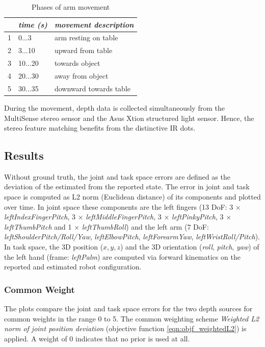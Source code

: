 \begin{table}[h]
\centering
\begin{tabular}{|c|l|l|}
\hline
 & \emph{time (s)} & \emph{movement description} \\
\hline
1 & 0$\dots$3 & arm resting on table \\
\hline
2 & 3$\dots$10 & upward from table \\
\hline
3 & 10$\dots$20 & towards object \\
\hline
4 & 20$\dots$30 & away from object \\
\hline
5 & 30$\dots$35 & downward towards table \\
\hline
\end{tabular}
\caption{Phases of arm movement}
\label{tab:prior_movement_phases}
\end{table}

During the movement, depth data is collected simultaneously from the MultiSense stereo sensor and the Asus Xtion structured light sensor. Hence, the stereo feature matching benefits from the distinctive IR dots.

\subsection{Results}
\label{sec:prior_results}

Without ground truth, the joint and task space errors are defined as the deviation of the estimated from the reported state.
The error in joint and task space is computed as L2 norm (Euclidean distance) of its components and plotted over time. In joint space these components are the left fingers (13 DoF: 3 $\times$ \emph{leftIndexFingerPitch}, 3 $\times$ \emph{leftMiddleFingerPitch}, 3 $\times$ \emph{leftPinkyPitch}, 3 $\times$ \emph{leftThumbPitch} and 1 $\times$ \emph{leftThumbRoll}) and the left arm (7 DoF: \emph{leftShoulderPitch/Roll/Yaw}, \emph{leftElbowPitch}, \emph{leftForearmYaw}, \emph{leftWristRoll/Pitch}). In task space, the 3D position ($x,y,z$) and the 3D orientation (\textit{roll}, \textit{pitch}, \textit{yaw}) of the left hand (frame: \emph{leftPalm}) are computed via forward kinematics on the reported and estimated robot configuration.

\subsubsection{Common Weight}

The plots compare the joint and task space errors for the two depth sources for common weights in the range 0 to 5. The common weighting scheme \emph{Weighted L2 norm of joint position deviation} (objective function \cref{eqn:objf_weightedL2}) is applied. A weight of 0 indicates that no prior is used at all.

